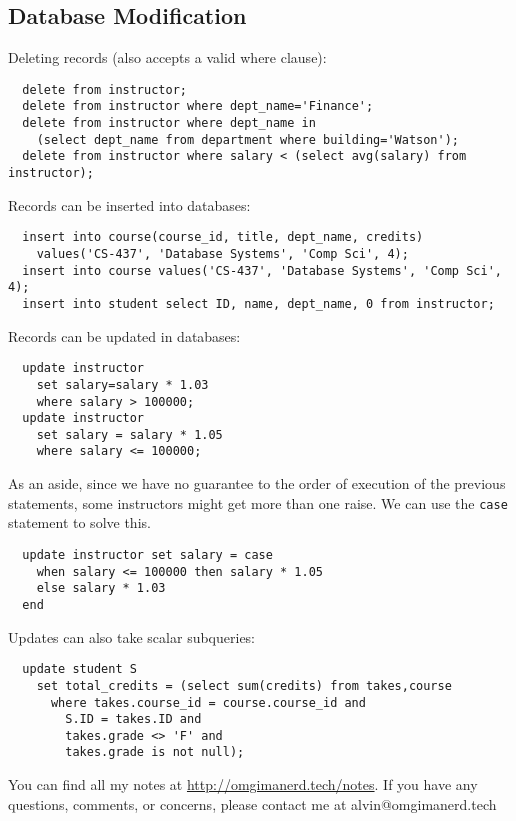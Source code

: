 \documentclass{math}
\begin{document}
\subsection*{Database Modification}
Deleting records (also accepts a valid where clause):
\begin{lstlisting}
  delete from instructor;
  delete from instructor where dept_name='Finance';
  delete from instructor where dept_name in
    (select dept_name from department where building='Watson');
  delete from instructor where salary < (select avg(salary) from instructor);
\end{lstlisting}
Records can be inserted into databases:
\begin{lstlisting}
  insert into course(course_id, title, dept_name, credits)
    values('CS-437', 'Database Systems', 'Comp Sci', 4);
  insert into course values('CS-437', 'Database Systems', 'Comp Sci', 4);
  insert into student select ID, name, dept_name, 0 from instructor;
\end{lstlisting}
Records can be updated in databases:
\begin{lstlisting}
  update instructor
    set salary=salary * 1.03
    where salary > 100000;
  update instructor
    set salary = salary * 1.05
    where salary <= 100000;
\end{lstlisting}
As an aside, since we have no guarantee to the order of execution of the
previous statements, some instructors might get more than one raise. We can
use the \texttt{case} statement to solve this.
\begin{lstlisting}
  update instructor set salary = case
    when salary <= 100000 then salary * 1.05
    else salary * 1.03
  end
\end{lstlisting}
Updates can also take scalar subqueries:
\begin{lstlisting}
  update student S
    set total_credits = (select sum(credits) from takes,course
      where takes.course_id = course.course_id and
        S.ID = takes.ID and
        takes.grade <> 'F' and
        takes.grade is not null);
\end{lstlisting}

\begin{center}
  You can find all my notes at \url{http://omgimanerd.tech/notes}. If you have
  any questions, comments, or concerns, please contact me at
  alvin@omgimanerd.tech
\end{center}
\end{document}
